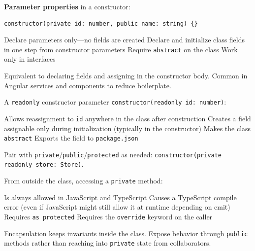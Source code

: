 \question[4]
\textbf{Parameter properties} in a constructor:
\begin{lstlisting}[style=ts]
constructor(private id: number, public name: string) {}
\end{lstlisting}
\begin{choices}
  \choice Declare parameters only---no fields are created
  \CorrectChoice Declare and initialize class fields in one step from constructor parameters
  \choice Require \lstinline[style=tsinline]|abstract| on the class
  \choice Work only in interfaces
\end{choices}
\begin{solution}
  Equivalent to declaring fields and assigning in the constructor body. Common in Angular services and components to reduce boilerplate.
\end{solution}

\question[4]
A \lstinline[style=tsinline]|readonly| constructor parameter \lstinline[style=tsinline]|constructor(readonly id: number)|:
\begin{choices}
  \choice Allows reassignment to \lstinline[style=tsinline]|id| anywhere in the class after construction
  \CorrectChoice Creates a field assignable only during initialization (typically in the constructor)
  \choice Makes the class \lstinline[style=tsinline]|abstract|
  \choice Exports the field to \texttt{package.json}
\end{choices}
\begin{solution}
  Pair with \lstinline[style=tsinline]|private|/\lstinline[style=tsinline]|public|/\lstinline[style=tsinline]|protected| as needed: \lstinline[style=tsinline]|constructor(private readonly store: Store)|.
\end{solution}

\question[4]
From outside the class, accessing a \lstinline[style=tsinline]|private| method:
\begin{choices}
  \choice Is always allowed in JavaScript and TypeScript
  \CorrectChoice Causes a TypeScript compile error (even if JavaScript might still allow it at runtime depending on emit)
  \choice Requires \lstinline[style=tsinline]|as protected|
  \choice Requires the \lstinline[style=tsinline]|override| keyword on the caller
\end{choices}
\begin{solution}
  Encapsulation keeps invariants inside the class. Expose behavior through \lstinline[style=tsinline]|public| methods rather than reaching into \lstinline[style=tsinline]|private| state from collaborators.
\end{solution}

